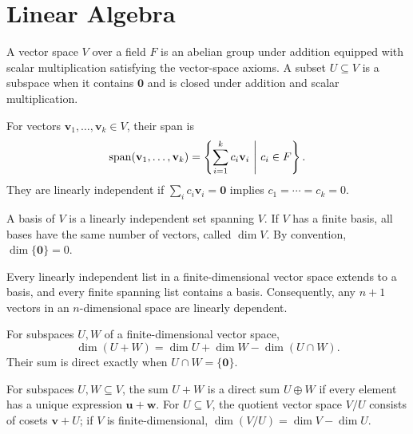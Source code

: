 \chapter{Linear Algebra}

\begin{definition}
A vector space $V$ over a field $F$ is an abelian group under addition equipped with scalar multiplication satisfying the vector-space axioms. A subset $U\subseteq V$ is a subspace when it contains $\mathbf0$ and is closed under addition and scalar multiplication.
\end{definition}

\begin{definition}
For vectors $\mathbf{v}_1,\dots,\mathbf{v}_k\in V$, their span is
\[
 \operatorname{span}(\mathbf{v}_1,\dots,\mathbf{v}_k)
 =\left\{\sum_{i=1}^k c_i\mathbf{v}_i\ \middle|\ c_i\in F\right\}.
\]
They are linearly independent if $\sum_i c_i\mathbf{v}_i=\mathbf0$ implies $c_1=\cdots=c_k=0$.
\end{definition}

\begin{definition}
A basis of $V$ is a linearly independent set spanning $V$. If $V$ has a finite basis, all bases have the same number of vectors, called $\dim V$. By convention, $\dim\{\mathbf0\}=0$.
\end{definition}

\begin{theorem}
Every linearly independent list in a finite-dimensional vector space extends to a basis, and every finite spanning list contains a basis. Consequently, any $n+1$ vectors in an $n$-dimensional space are linearly dependent.
\end{theorem}

\begin{theorem}
For subspaces $U,W$ of a finite-dimensional vector space,
\[
 \dim(U+W)=\dim U+\dim W-\dim(U\cap W).
\]
Their sum is direct exactly when $U\cap W=\{\mathbf0\}$.
\end{theorem}

\begin{definition}
For subspaces $U,W\subseteq V$, the sum $U+W$ is a direct sum $U\oplus W$ if every element has a unique expression $\mathbf{u}+\mathbf{w}$. For $U\subseteq V$, the quotient vector space $V/U$ consists of cosets $\mathbf{v}+U$; if $V$ is finite-dimensional, $\dim(V/U)=\dim V-\dim U$.
\end{definition}

